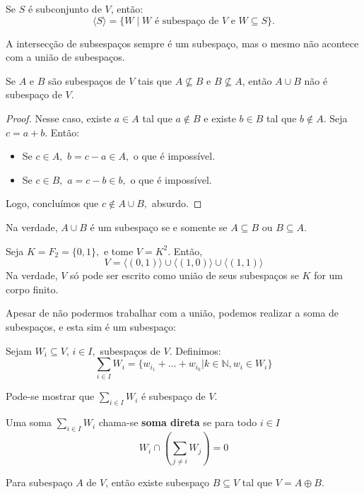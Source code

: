 \documentclass[11pt,twoside,a4paper]{book}
\begin{document}
\begin{proposicao}
Se $S$ é subconjunto de $V$, então:
\[
\langle S\rangle=\{W\mid W\text{ é subespaço de }V\text{ e }W\subseteq S\}.
\]
\end{proposicao}
A intersecção de subsespaços sempre é um subespaço, mas o mesmo não acontece com a união de subespaços.
\begin{proposicao}\label{unotsubsp}
Se $A$ e $B$ são subespaços de $V$ tais que $A\nsubseteq B$ e $B\nsubseteq A$, então $A\cup B$ não é subespaço de $V$.
\end{proposicao}
\begin{proof}
Nesse caso, existe $a\in A$ tal que $a\notin B$ e existe $b\in B$ tal que $b\notin A$. Seja $c=a+b$. Então:
\begin{itemize}
    \item Se $c \in A,$ $b = c - a \in A,$ o que é impossível.
    \item Se $c \in B,$ $a = c - b \in b,$ o que é impossível.
\end{itemize}
Logo, concluímos que $c \notin A \cup B,$ absurdo.

\end{proof}

Na verdade, $A \cup B$ é um subespaço se e somente se $A \subseteq B$ ou $B \subseteq A.$

\begin{observacao}
Seja $K = F_2 = \{ 0, 1 \},$ e tome $V = K^2.$ Então,
\[
V = \langle (0,1) \rangle \cup \langle (1,0) \rangle \cup \langle (1,1) \rangle
\]
Na verdade, $V$ só pode ser escrito como união de seus subespaços se $K$ for um corpo finito.
\end{observacao}

Apesar de não podermos trabalhar com a união, podemos realizar a soma de subespaços, e esta sim é um subespaço:

\begin{definicao}
Sejam $W_i \subseteq V$, $i \in I,$ subespaços de $V.$ Definimos:
\[
\sum\limits_{i \in I} W_i = \{ w_{i_1} + \ldots + w_{i_k} | k \in \mathbb{N}, w_i \in W_i \}
\]
\end{definicao}
Pode-se mostrar que $\sum\limits_{i \in I} W_i $ é subespaço de $V$.
\begin{definicao}
Uma soma $\sum\limits_{i \in I} W_i$ chama-se \textbf{soma direta} se para todo $i \in I$
\[
W_i \cap \left( \sum\limits_{j \neq i} W_j \right) = 0
\]
\end{definicao}
\begin{teorema}
Para subespaço $A$ de $V$, então existe subespaço $B\subseteq V$ tal que $V=A\oplus B$.
\end{teorema}
\end{document}
